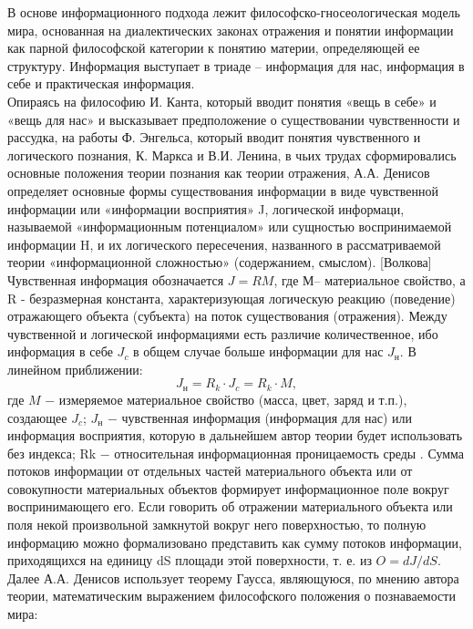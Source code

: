 \documentclass[a4paper,12pt]{report}
\begin{document}
	В основе информационного подхода лежит философско-гносеологическая модель мира, основанная на диалектических законах отражения и понятии информации как парной философской категории к понятию материи, определяющей ее структуру. Информация выступает в триаде – информация для нас, информация в себе и практическая информация.\\
Опираясь на философию И. Канта, который вводит понятия «вещь в себе» и «вещь для нас» и высказывает предположение о существовании чувственности и рассудка, на работы Ф. Энгельса, который вводит понятия чувственного и логического познания, К. Маркса и В.И. Ленина, в чьих трудах сформировались основные положения теории познания как теории отражения, А.А. Денисов определяет основные формы существования информации в виде чувственной информации или «информации восприятия» J, логической информаци, называемой «информационным потенциалом» или сущностью воспринимаемой информации H, и их логического пересечения, названного в рассматриваемой теории «информационной сложностью» (содержанием, смыслом). [Волкова] \\
	Чувственная информация обозначается $J = RM$, где $М $– материальное свойство, а R - безразмерная константа, характеризующая логическую реакцию (поведение) отражающего объекта (субъекта) на поток существования (отражения). Между чувственной и логической информациями есть различие количественное, ибо информация в себе $J_c$ в общем случае больше информации для нас $J_н$. В линейном приближении: \\
\begin{equation}
\label{trivial}
	 J_н = R_k \cdot J_c  = R_k \cdot M,                                          				          
\end{equation}
где $M$ − измеряемое материальное свойство (масса, цвет, заряд и т.п.), создающее $J_c$; $J_н$ − чувственная информация (информация для нас) или информация восприятия, которую в дальнейшем автор теории будет использовать без индекса; Rk − относительная информационная проницаемость среды .
	Сумма потоков информации от отдельных частей материального объекта или от совокупности материальных объектов формирует информационное поле вокруг воспринимающего его. Если говорить об отражении материального объекта или поля некой произвольной замкнутой вокруг него поверхностью, то полную информацию можно формализовано представить как сумму потоков информации, приходящихся на единицу dS площади этой поверхности, т. е. из $O = dJ/dS$. Далее А.А. Денисов использует теорему Гаусса, являющуюся, по мнению автора теории, математическим выражением философского положения о познаваемости мира:
\end{document}
